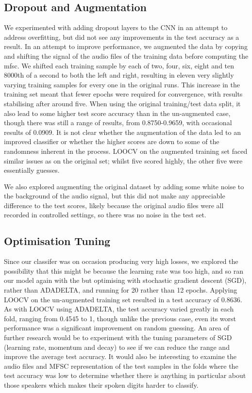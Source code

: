 \subsection{Dropout and Augmentation}
We experimented with adding dropout layers to the CNN in an attempt to address overfitting, but did not see any improvements in the test accuracy as a result. In an attempt to improve performance, we augmented the data by copying and shifting the signal of the audio files of the training data before computing the mfsc. We shifted each training sample by each of two, four, six, eight and ten 8000th of a second to both the left and right, resulting in eleven very slightly varying training samples for every one in the original runs. This increase in the training set meant that fewer epochs were required for convergence, with results stabilising after around five. When using the original training/test data split, it also lead to some higher test score accuracy than in the un-augmented case, though there was still a range of results, from 0.8750-0.9659, with occasional results of 0.0909. It is not clear whether the augmentation of the data led to an improved classifier or whether the higher scores are down to some of the randomness inherent in the process.
LOOCV on the augmented training set faced similar issues as on the original set; whilst five scored highly, the other five were essentially guesses.

We also explored augmenting the original dataset by adding some white noise to the background of the audio signal, but this did not make any appreciable difference to the test scores, likely because the original audio files were all recorded in controlled settings, so there was no noise in the test set.

\subsection{Optimisation Tuning}
Since our classifer was on occasion producing very high losses, we explored the possibility that this might be because the learning rate was too high, and so ran our model again with the but optimising with stochastic gradient descent (SGD), rather than ADADELTA, and running for 20 rather than 12 epochs. Applying LOOCV on the un-augmented training set resulted in a test accuracy of 0.8636. As with LOOCV using ADADELTA, the test accuracy varied greatly in each fold, ranging from 0.4545 to 1, though unlike the previous case, even its worst performance was a significant improvement on random guessing. An area of further research would be to experiment with the tuning parameters of SGD (learning rate, momentum and decay) to see if we can reduce the range and improve the average test accuracy. It would also be interesting to examine the audio files and MFSC representation of the test samples in the folds where the test accuracy was low to determine whether there is anything in particular about those speakers which makes their spoken digits harder to classify. 

